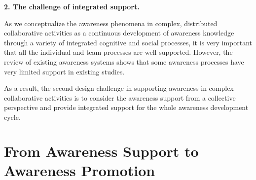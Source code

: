 \textbf{2. The challenge of integrated support.}

As we conceptualize the awareness phenomena in complex, distributed collaborative activities as a continuous development of awareness knowledge through a variety of integrated cognitive and social processes, it is very important that all the individual and team processes are well supported. However, the review of existing awareness systems shows that some awareness processes have very limited support in existing studies.

 


As a result, the second design challenge in supporting awareness in complex collaborative activities is to consider the awareness support from a collective perspective and provide integrated support for the whole awareness development cycle.

\section{From Awareness Support to Awareness Promotion} %
\label{sec:from_support_to_promotion}

